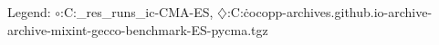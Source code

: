 Legend: {\color{CornflowerBlue}$\circ$}:C:\Users\tristan\Documents\ppsn\BBOB\raw\_res\remaining\_runs\new\_ic\exdata\base-CMA-ES, {\color{Orange}$\diamondsuit$}:C:\Users\tristan\.cocopp\data-archives\numbbo.github.io\data-archive\data-archive\bbob-mixint-gecco-benchmark\CMA-ES-pycma.tgz